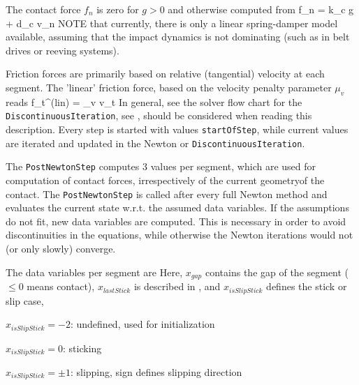     The contact force $f_n$ is zero for $g > 0$ and otherwise computed from 
    \be \label{ObjectContactFrictionCircleCable2D:contactForce}
      f_n = k_c \cdot g + d_c \cdot v_n
    \ee
    NOTE that currently, there is only a linear spring-damper model available, assuming that the impact dynamics 
    is not dominating (such as in belt drives or reeving systems).

    Friction forces are primarily based on relative (tangential) velocity at each segment.
    The 'linear' friction force, based on the velocity penalty parameter $\mu_v$ reads
    \be
      f_t^{(lin)} = \mu_v \cdot v_t \eqComma
    \ee    
    In general, see the solver flow chart for the \texttt{DiscontinuousIteration}, see , should be considered when reading this description. Every step is started with values \texttt{startOfStep}, while current values are iterated and updated in the Newton or \texttt{DiscontinuousIteration}.
    
    The \texttt{PostNewtonStep} computes 3 values per segment, which are used for computation of contact forces, irrespectively of the 
    current geometryof the contact. 
    The \texttt{PostNewtonStep} is called after every full Newton method and evaluates the current state w.r.t. the assumed data variables.
    If the assumptions do not fit, new data variables are computed.
    This is necessary in order to avoid discontinuities in the equations, while otherwise the Newton iterations would not 
    (or only slowly) converge.

    The data variables per segment are
    \ee
    Here, $x_{gap}$ contains the gap of the segment ($\le 0$ means contact), $x_{lastStick}$ is described in 
    , and 
    $x_{isSlipStick}$ defines the stick or slip case,
    \bi
      \item $x_{isSlipStick} = -2$: undefined, used for initialization
      \item $x_{isSlipStick} = 0$: sticking
      \item $x_{isSlipStick} = \pm 1$: slipping, sign defines slipping direction
    \ei
    

